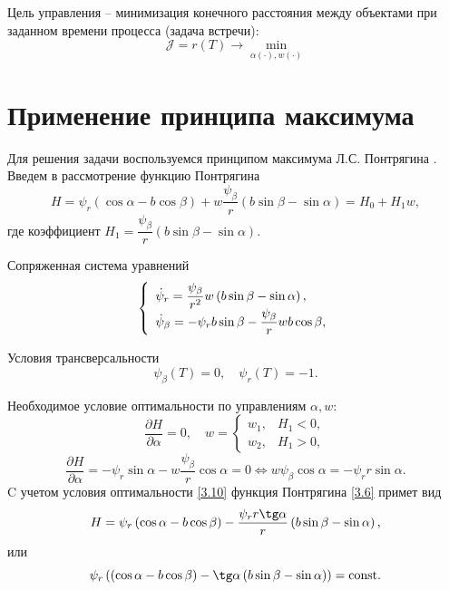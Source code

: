 \documentclass[a4paper,12pt, openany]{book}
\theoremstyle{plain} %
\theoremstyle{definition} %
\theoremstyle{remark} %
\numberwithin{equation}{chapter}
\begin{document}
{Цель управления -- минимизация конечного расстояния между объектами при заданном времени процесса (задача встречи):
\begin{equation}\label{3.5}
\mathcal{J} = r(T) \longrightarrow \mathop {\min }\limits_{\alpha(\cdot),w(\cdot)} 
\end{equation}

\section{Применение принципа максимума} Для решения задачи воспользуемся принципом максимума Л.С. Понтрягина \cite{Optimal}. Введем в рассмотрение функцию Понтрягина
\begin{equation}\label{3.6}
H = \psi _r \left( {\cos \alpha  - b\cos \beta } \right) + w\frac{{\psi _\beta  }}{r}\left( {b\sin \beta  - \sin \alpha } \right) = H_0 + H_1 w,
\end{equation}
где коэффициент $H_1  = \dfrac{{\psi _\beta  }}{r}\left( {b\sin \beta  - \sin \alpha } \right).
$

Сопряженная система уравнений
\begin{equation}\label{3.7}
\left\{ {\begin{array}{*{20}l}
   {\dot \psi _r  = \dfrac{{\psi _\beta  }}{{r^2 }}w\left( {b\sin \beta  - \sin \alpha } \right),} \hfill  \\
   {\dot \psi _\beta   =  - \psi _r b\sin \beta  - \dfrac{{\psi _\beta  }}{r}wb\cos \beta ,} \hfill  \\
\end{array}} \right.
\end{equation}


Условия трансверсальности 
\begin{equation}\label{3.8}
\psi _\beta  \left( T \right) = 0,\quad  \psi_r(T) = -1.
\end{equation}

Необходимое условие оптимальности по управлениям $\alpha,w$:
\begin{equation}\label{3.9}
\frac{{\partial H}}{{\partial \alpha }} = 0,\quad w = 
\begin{cases}
w_1, & H_1 < 0, \\
w_2, & H_1 > 0, 
\end{cases}
\end{equation}
\begin{equation}\label{3.10}
\frac{{\partial H}}{{\partial \alpha }} =  - \psi _r \sin \alpha  - w\frac{{\psi _\beta  }}{r}\cos \alpha  = 0 \Longleftrightarrow w\psi _\beta  \cos \alpha  =  - \psi _r r\sin \alpha .
\end{equation}
C учетом условия оптимальности \eqref{3.10} функция Понтрягина \eqref{3.6} примет вид
\begin{equation}\label{3.11}
H = \psi _r \left( {\cos \alpha  - b\cos \beta } \right) - \frac{{\psi _r r\tg\alpha }}{r}\left( {b\sin \beta  - \sin \alpha } \right),
\end{equation}
или
\begin{equation}\label{3.12}
\psi _r \left( {\left( {\cos \alpha  - b\cos \beta } \right) - \tg\alpha \left( {b\sin \beta  - \sin \alpha } \right)} \right) = \mathrm{const}.
\end{equation}

}
\end{document}
